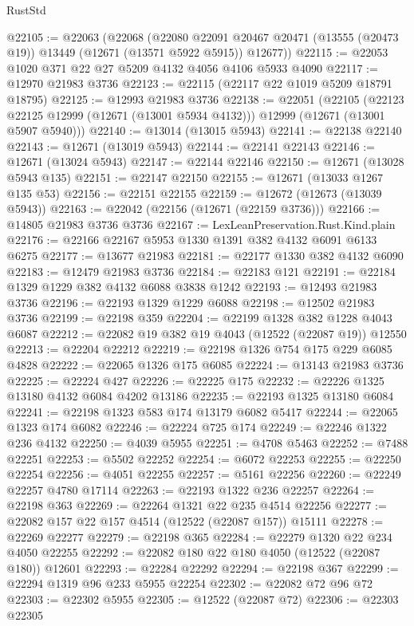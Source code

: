 \begin{lexlean}{RustStd}
\begin{coremodule}
@22105 := @22063
    (@22068
      (@22080
        @22091
        @20467
        @20471
        (@13555 (@20473 @19))
        @13449
        (@12671 (@13571 @5922 @5915))
        @12677))
@22115 := @22053 @1020 @371 @22 @27 @5209 @4132 @4056 @4106 @5933 @4090
@22117 := @12970 @21983 @3736
@22123 := @22115 (@22117 @22 @1019 @5209 @18791 @18795)
@22125 := @12993 @21983 @3736
@22138 := @22051
    (@22105
      (@22123 @22125 @12999 (@12671 (@13001 @5934 @4132)))
      @12999
      (@12671 (@13001 @5907 @5940)))
@22140 := @13014 (@13015 @5943)
@22141 := @22138 @22140
@22143 := @12671 (@13019 @5943)
@22144 := @22141 @22143
@22146 := @12671 (@13024 @5943)
@22147 := @22144 @22146
@22150 := @12671 (@13028 @5943 @135)
@22151 := @22147 @22150
@22155 := @12671 (@13033 @1267 @135 @53)
@22156 := @22151 @22155
@22159 := @12672 (@12673 (@13039 @5943))
@22163 := @22042 (@22156 (@12671 (@22159 @3736)))
@22166 := @14805 @21983 @3736 @3736
@22167 := LexLeanPreservation.Rust.Kind.plain
@22176 := @22166 @22167 @5953 @1330 @1391 @382 @4132 @6091 @6133 @6275
@22177 := @13677 @21983
@22181 := @22177 @1330 @382 @4132 @6090
@22183 := @12479 @21983 @3736
@22184 := @22183 @121
@22191 := @22184 @1329 @1229 @382 @4132 @6088 @3838 @1242
@22193 := @12493 @21983 @3736
@22196 := @22193 @1329 @1229 @6088
@22198 := @12502 @21983 @3736
@22199 := @22198 @359
@22204 := @22199 @1328 @382 @1228 @4043 @6087
@22212 := @22082 @19 @382 @19 @4043 (@12522 (@22087 @19)) @12550
@22213 := @22204 @22212
@22219 := @22198 @1326 @754 @175 @229 @6085 @4828
@22222 := @22065 @1326 @175 @6085
@22224 := @13143 @21983 @3736
@22225 := @22224 @427
@22226 := @22225 @175
@22232 := @22226 @1325 @13180 @4132 @6084 @4202 @13186
@22235 := @22193 @1325 @13180 @6084
@22241 := @22198 @1323 @583 @174 @13179 @6082 @5417
@22244 := @22065 @1323 @174 @6082
@22246 := @22224 @725 @174
@22249 := @22246 @1322 @236 @4132
@22250 := @4039 @5955
@22251 := @4708 @5463
@22252 := @7488 @22251
@22253 := @5502 @22252
@22254 := @6072 @22253
@22255 := @22250 @22254
@22256 := @4051 @22255
@22257 := @5161 @22256
@22260 := @22249 @22257 @4780 @17114
@22263 := @22193 @1322 @236 @22257
@22264 := @22198 @363
@22269 := @22264 @1321 @22 @235 @4514 @22256
@22277 := @22082 @157 @22 @157 @4514 (@12522 (@22087 @157)) @15111
@22278 := @22269 @22277
@22279 := @22198 @365
@22284 := @22279 @1320 @22 @234 @4050 @22255
@22292 := @22082 @180 @22 @180 @4050 (@12522 (@22087 @180)) @12601
@22293 := @22284 @22292
@22294 := @22198 @367
@22299 := @22294 @1319 @96 @233 @5955 @22254
@22302 := @22082 @72 @96 @72
@22303 := @22302 @5955
@22305 := @12522 (@22087 @72)
@22306 := @22303 @22305

\end{coremodule}
\end{lexlean}
